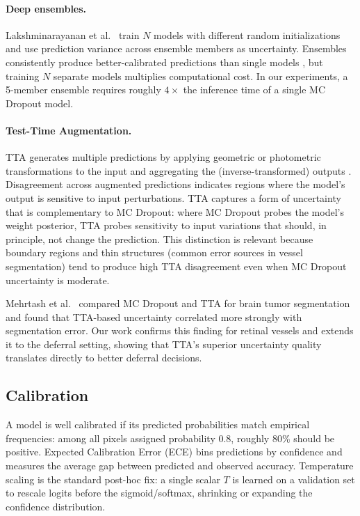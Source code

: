 \paragraph{Deep ensembles.} Lakshminarayanan et al.\
\citep{lakshminarayanan2017simple} train $N$ models with different random
initializations and use prediction variance across ensemble members as
uncertainty. Ensembles consistently produce better-calibrated predictions than
single models \citep{ovadia2019can}, but training $N$ separate models multiplies
computational cost. In our experiments, a 5-member ensemble requires roughly
$4\times$ the inference time of a single MC Dropout model.

\paragraph{Test-Time Augmentation.} TTA generates multiple predictions by
applying geometric or photometric transformations to the input and aggregating
the (inverse-transformed) outputs \citep{wang2019aleatoric,
ayhan2018test,moshkov2020tta}. Disagreement across augmented predictions
indicates regions where the model's output is sensitive to input perturbations.
TTA captures a form of uncertainty that is complementary to MC Dropout:
where MC Dropout probes the model's weight posterior, TTA probes sensitivity
to input variations that should, in principle, not change the prediction. This
distinction is relevant because boundary regions and thin structures (common
error sources in vessel segmentation) tend to produce high TTA disagreement
even when MC Dropout uncertainty is moderate.

Mehrtash et al.\ \citep{mehrtash2020confidence} compared MC Dropout and TTA
for brain tumor segmentation and found that TTA-based uncertainty correlated
more strongly with segmentation error. Our work confirms this finding for
retinal vessels and extends it to the deferral setting, showing that TTA's
superior uncertainty quality translates directly to better deferral decisions.

\subsection{Calibration}

A model is well calibrated if its predicted probabilities match empirical
frequencies: among all pixels assigned probability 0.8, roughly 80\% should
be positive. Expected Calibration Error (ECE) \citep{naeini2015obtaining}
bins predictions by confidence and measures the average gap between predicted
and observed accuracy. Temperature scaling \citep{guo2017calibration} is the
standard post-hoc fix: a single scalar $T$ is learned on a validation set to
rescale logits before the sigmoid/softmax, shrinking or expanding the
confidence distribution.

